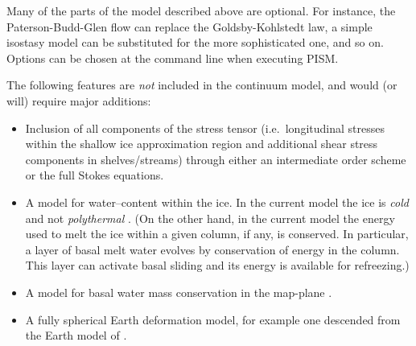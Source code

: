 \documentclass[12pt,final]{amsart}%
\theoremstyle{plain}
\theoremstyle{definition}
\theoremstyle{remark}
\begin{document}
Many of the parts of the model described above are optional.  For instance, the Paterson-Budd-Glen \citep{PatersonBudd} flow can replace the Goldsby-Kohlstedt law, a simple isostasy model can be substituted for the more sophisticated one, and so on.  Options can be chosen at the command line when executing PISM.

The following features are \emph{not} included in the continuum model, and would (or will) require major additions:
\begin{itemize}
\item Inclusion of all components of the stress tensor (i.e.~longitudinal stresses within the shallow ice approximation region and additional shear stress components in shelves/streams) through either an intermediate order scheme \citep{Blatter,SaitoEISMINT} or the full Stokes equations.
\item A model for water--content within the ice.  In the current model the ice is \emph{cold} and not \emph{polythermal} \citep[compare][]{Greve}.  (On the other hand, in the current model the energy used to melt the ice within a given column, if any, is conserved.  In particular, a layer of basal melt water evolves by conservation of energy in the column.  This layer can activate basal sliding and its energy is available for refreezing.) 
\item A model for basal water mass conservation in the map-plane \citep[compare][]{JohnsonFastook}.
\item A fully spherical Earth deformation model, for example one descended from the Earth model of \citet{Peltier}.
\end{itemize}
\end{document}
